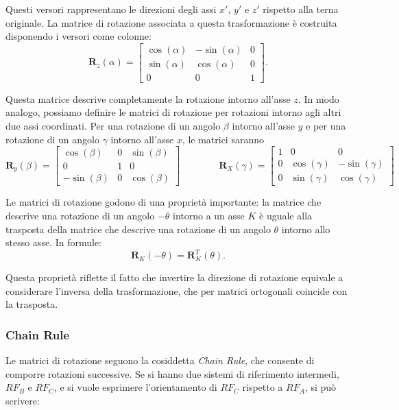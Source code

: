 ﻿\documentclass[11pt, a4paper]{article}
\begin{document}
Questi versori rappresentano le direzioni degli assi $x'$, $y'$ e $z'$ rispetto alla terna originale. La matrice di rotazione associata a questa trasformazione è costruita disponendo i versori come colonne:
\[
\mathbf{R}_{z}(\alpha) =
\begin{bmatrix}
    \cos(\alpha) & -\sin(\alpha) & 0 \\
    \sin(\alpha) & \cos(\alpha) & 0 \\
    0 & 0 & 1
\end{bmatrix}.
\]

Questa matrice descrive completamente la rotazione intorno all'asse $z$. In modo analogo, possiamo definire le matrici di rotazione per rotazioni intorno agli altri due assi coordinati. Per una rotazione di un angolo $\beta$ intorno all'asse $y$ e per una rotazione di un angolo $\gamma$ intorno all'asse $x$, le matrici saranno
\[
\mathbf{R}_{y}(\beta) =
\begin{bmatrix}
    \cos(\beta) & 0 & \sin(\beta) \\
    0 & 1 & 0 \\
    -\sin(\beta) & 0 & \cos(\beta)
\end{bmatrix}
\qquad\qquad
\mathbf{R}_{X}(\gamma) =
\begin{bmatrix}
    1 & 0 & 0 \\
    0 & \cos(\gamma) & -\sin(\gamma) \\
    0 & \sin(\gamma) & \cos(\gamma)
\end{bmatrix}
\]

Le matrici di rotazione godono di una proprietà importante: la matrice che descrive una rotazione di un angolo $-\theta$ intorno a un asse $K$ è uguale alla trasposta della matrice che descrive una rotazione di un angolo $\theta$ intorno allo stesso asse. In formule:
\[
\mathbf{R}_{K}(-\theta) = \mathbf{R}_{K}^{T}(\theta).
\]

Questa proprietà riflette il fatto che invertire la direzione di rotazione equivale a considerare l'inversa della trasformazione, che per matrici ortogonali coincide con la trasposta.
\subsubsection{Chain Rule}
Le matrici di rotazione seguono la cosiddetta \emph{Chain Rule}, che consente di comporre rotazioni successive. Se si hanno due sistemi di riferimento intermedi, \( RF_{B} \) e \( RF_{C} \), e si vuole esprimere l'orientamento di \( RF_{C} \) rispetto a \( RF_{A} \), si può scrivere:
\end{document}
